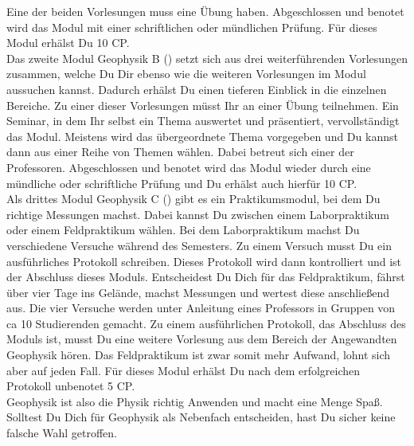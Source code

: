 Eine der beiden Vorlesungen muss eine Übung haben.
Abgeschlossen und benotet wird das Modul mit einer schriftlichen oder mündlichen Prüfung.
Für dieses Modul erhälst Du 10 CP.\\
Das zweite Modul Geophysik B () setzt sich aus drei weiterführenden Vorlesungen zusammen,
welche Du Dir ebenso wie die weiteren Vorlesungen im Modul  aussuchen kannst.
Dadurch erhälst Du einen tieferen Einblick in die einzelnen Bereiche.
Zu einer dieser Vorlesungen müsst Ihr an einer Übung teilnehmen.
Ein Seminar, in dem Ihr selbst ein Thema auswertet und präsentiert, vervollständigt das Modul.
Meistens wird das übergeordnete Thema vorgegeben und Du kannst dann aus einer Reihe von Themen wählen.
Dabei betreut sich einer der Professoren.
Abgeschlossen und benotet wird das Modul wieder durch eine mündliche oder schriftliche Prüfung und Du erhälst auch hierfür 10 CP.\\
Als drittes Modul Geophysik C () gibt es ein Praktikumsmodul, bei dem Du richtige Messungen machst.
Dabei kannst Du zwischen einem Laborpraktikum oder einem Feldpraktikum wählen.
Bei dem Laborpraktikum machst Du verschiedene Versuche während des Semesters.
Zu einem Versuch musst Du ein ausführliches Protokoll schreiben.
Dieses Protokoll wird dann kontrolliert und ist der Abschluss dieses Moduls.
Entscheidest Du Dich für das Feldpraktikum, fährst über vier Tage ins Gelände, machst Messungen und wertest diese anschließend aus.
Die vier Versuche werden unter Anleitung eines Professors in Gruppen von ca 10 Studierenden gemacht.
Zu einem ausführlichen Protokoll, das Abschluss des Moduls ist, musst Du eine weitere Vorlesung aus dem Bereich der Angewandten Geophysik hören.
Das Feldpraktikum ist zwar somit mehr Aufwand, lohnt sich aber auf jeden Fall.
Für dieses Modul erhälst Du nach dem erfolgreichen Protokoll unbenotet 5 CP.\\

Geophysik ist also die Physik richtig Anwenden und macht eine Menge Spaß.
Solltest Du Dich für Geophysik als Nebenfach entscheiden, hast Du sicher keine falsche Wahl getroffen.
